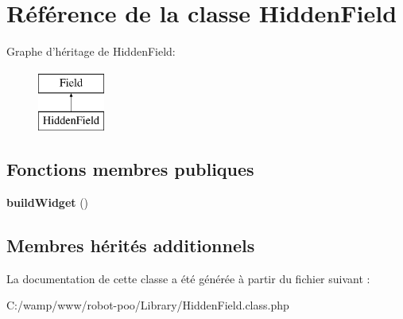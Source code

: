 \hypertarget{class_library_1_1_hidden_field}{\section{Référence de la classe Hidden\+Field}
\label{class_library_1_1_hidden_field}
}
Graphe d'héritage de Hidden\+Field\+:\begin{figure}[H]
\begin{center}
\leavevmode
\includegraphics[height=2.000000cm]{class_library_1_1_hidden_field}
\end{center}
\end{figure}
\subsection*{Fonctions membres publiques}
\begin{DoxyCompactItemize}
\item 
\hypertarget{class_library_1_1_hidden_field_a3724547eb0ec2b00884571328d7e2d5d}{{\bfseries build\+Widget} ()}\label{class_library_1_1_hidden_field_a3724547eb0ec2b00884571328d7e2d5d}

\end{DoxyCompactItemize}
\subsection*{Membres hérités additionnels}


La documentation de cette classe a été générée à partir du fichier suivant \+:\begin{DoxyCompactItemize}
\item 
C\+:/wamp/www/robot-\/poo/\+Library/Hidden\+Field.\+class.\+php\end{DoxyCompactItemize}
